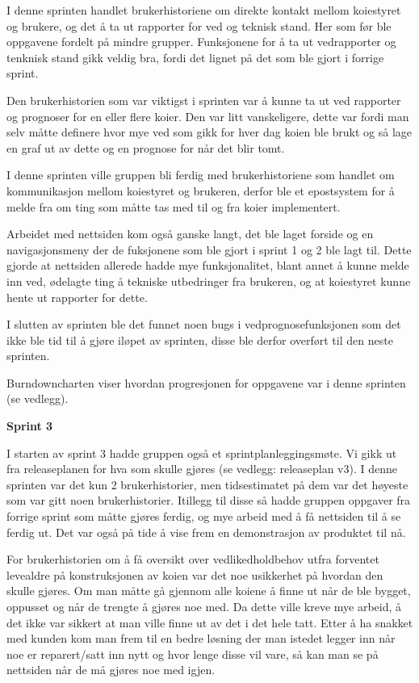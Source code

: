 \documentclass[12pt,a4paper,norsk]{article}
\begin{document}
I denne sprinten handlet brukerhistoriene om direkte kontakt mellom koiestyret og brukere, og det å ta ut rapporter for ved og teknisk stand. Her som før ble oppgavene fordelt på mindre grupper. Funksjonene for å ta ut vedrapporter og tenknisk stand gikk veldig bra, fordi det lignet på det som ble gjort i forrige sprint.

Den brukerhistorien som var viktigst i sprinten var å kunne ta ut ved rapporter og prognoser for en eller flere koier. Den var litt vanskeligere, dette var fordi man selv måtte definere hvor mye ved som gikk for hver dag koien ble brukt og så lage en graf ut av dette og en prognose for når det blir tomt. 

I denne sprinten ville gruppen bli ferdig med brukerhistoriene som handlet om kommunikasjon mellom koiestyret og brukeren, derfor ble et epostsystem for å melde fra om ting som måtte tas med til og fra koier implementert. 

Arbeidet med nettsiden kom også ganske langt, det ble laget forside og en navigasjonsmeny der de fuksjonene som ble gjort i sprint 1 og 2 ble lagt til. Dette gjorde at nettsiden allerede hadde mye funksjonalitet, blant annet å kunne melde inn ved, ødelagte ting å tekniske utbedringer fra brukeren, og at koiestyret kunne hente ut rapporter for dette. 

I slutten av sprinten ble det funnet noen bugs i vedprognosefunksjonen som det ikke ble tid til å gjøre iløpet av sprinten, disse ble derfor overført til den neste sprinten.

Burndowncharten viser hvordan progresjonen for oppgavene var i denne sprinten (se vedlegg).

\bigskip \noindent \textbf{Sprint 3}
\par I starten av sprint 3 hadde gruppen også et sprintplanleggingsmøte. Vi gikk ut fra releaseplanen for hva som skulle gjøres (se vedlegg: releaseplan v3). I denne sprinten var det kun 2 brukerhistorier, men tidsestimatet på dem var det høyeste som var gitt noen brukerhistorier. Itillegg til disse så hadde gruppen oppgaver fra forrige sprint som måtte gjøres ferdig, og mye arbeid med å få nettsiden til å se ferdig ut. Det var også på tide å vise frem en demonstrasjon av produktet til nå. 

For brukerhistorien om å få oversikt over vedlikedholdbehov utfra forventet levealdre på konstruksjonen av koien var det noe usikkerhet på hvordan den skulle gjøres. Om man måtte gå gjennom alle koiene å finne ut når de ble bygget, oppusset og når de trengte å gjøres noe med. Da dette ville kreve mye arbeid, å det ikke var sikkert at man ville finne ut av det i det hele tatt. Etter å ha snakket med kunden kom man frem til en bedre løsning der man istedet legger inn når noe er reparert/satt inn nytt og hvor lenge disse vil vare, så kan man se på nettsiden når de må gjøres noe med igjen. 
\end{document}
